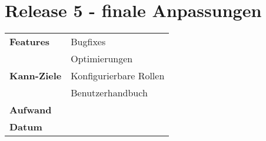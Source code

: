 \section*{Release 5 - finale Anpassungen}
\label{sec:release_5}

\begin{tabular}{p{5cm} p{9cm}}
    \textbf{Features} &  Bugfixes \\
    & Optimierungen \\
    \hline
    \textbf{Kann-Ziele} & Konfigurierbare Rollen \\
    & Benutzerhandbuch \\
    \hline
    \textbf{Aufwand} & \\
    \hline
    \textbf{Datum} & 
\end{tabular}